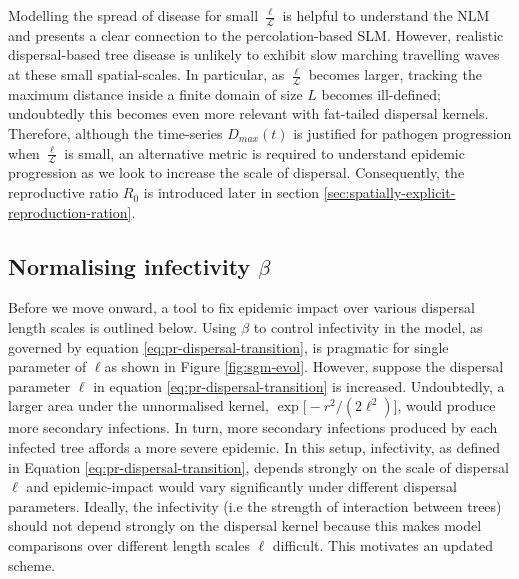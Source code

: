 Modelling the spread of disease for small $\frac{\ell}{\mathcal{L}}$ is helpful to understand the NLM and presents a clear connection to the percolation-based SLM.
However, realistic dispersal-based tree disease is unlikely to exhibit slow marching travelling waves at these small spatial-scales.
In particular, as $\frac{\ell}{\mathcal{L}}$ becomes larger, tracking the maximum distance inside a finite domain of size $L$ becomes ill-defined; undoubtedly this becomes even more relevant with fat-tailed dispersal kernels.
Therefore, although the time-series $D_{max}(t)$ is justified for pathogen progression when $\frac{\ell}{\mathcal{L}}$ is small, an alternative metric is required to understand epidemic progression as we look to increase the scale of dispersal.
Consequently, the reproductive ratio $R_0$ is introduced later in section \ref{sec:spatially-explicit-reproduction-ration}.

\newpage 

\subsection{Normalising infectivity $\beta$}

Before we move onward, a tool to fix epidemic impact over various dispersal length scales is outlined below.
Using $\beta$ to control infectivity in the model, as governed by equation \ref{eq:pr-dispersal-transition}, is pragmatic for single parameter of $\ell$\textemdash as shown in Figure \ref{fig:sgm-evol}.
However, suppose the dispersal parameter $\ell$ in equation \ref{eq:pr-dispersal-transition} is increased. 
Undoubtedly, a larger area under the unnormalised kernel, $\exp\big[-r^2/(2\ell^2)\big]$, would produce more secondary infections.
In turn, more secondary infections produced by each infected tree affords a more severe epidemic.
In this setup, infectivity, as defined in Equation \ref{eq:pr-dispersal-transition}, depends strongly on the scale of dispersal $\ell$ and epidemic-impact would vary significantly under different dispersal parameters.
Ideally, the infectivity (i.e the strength of interaction between trees) should not depend strongly on the dispersal kernel because this makes model comparisons over different length scales $\ell$ difficult. This motivates an updated scheme.

